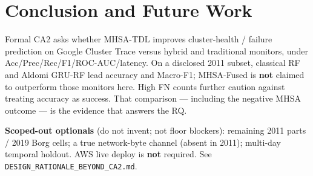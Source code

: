 
\section{Conclusion and Future Work}
\label{sec:Conclusion}

Formal CA2 asks whether MHSA-TDL improves cluster-health / failure prediction on Google Cluster Trace versus hybrid and traditional monitors, under Acc/Prec/Rec/F1/ROC-AUC/latency. On a disclosed 2011 subset, classical RF and Aldomi GRU-RF lead accuracy and Macro-F1; MHSA-Fused is \textbf{not} claimed to outperform those monitors here. High FN counts further caution against treating accuracy as success. That comparison --- including the negative MHSA outcome --- is the evidence that answers the RQ.

\textbf{Scoped-out optionals} (do not invent; not floor blockers): remaining 2011 parts / 2019 Borg cells; a true network-byte channel (absent in 2011); multi-day temporal holdout. AWS live deploy is \textbf{not} required. See \texttt{DESIGN\_RATIONALE\_BEYOND\_CA2.md}.
